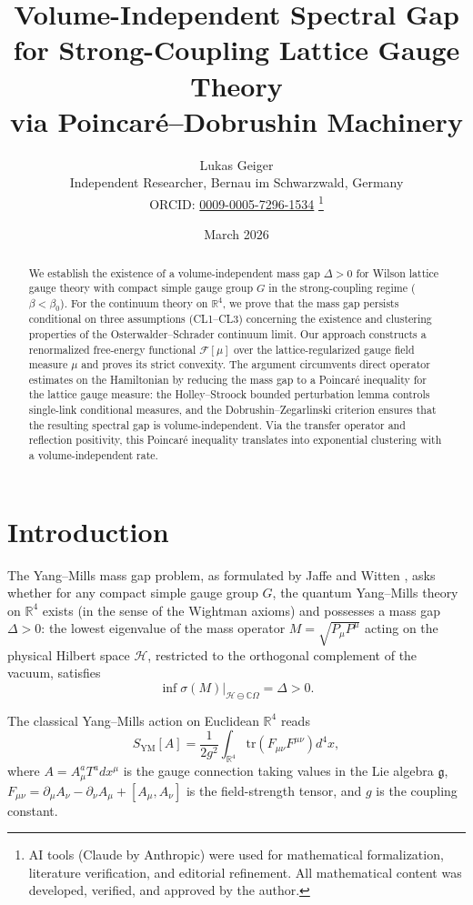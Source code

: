 \documentclass[12pt,a4paper]{article}
\title{\textbf{Volume-Independent Spectral Gap for Strong-Coupling Lattice Gauge Theory\\ via Poincar\'e--Dobrushin Machinery}}
\author{Lukas Geiger\\
\small Independent Researcher, Bernau im Schwarzwald, Germany\\
\small ORCID: \href{https://orcid.org/0009-0005-7296-1534}{0009-0005-7296-1534}%
\thanks{AI tools (Claude by Anthropic) were used for mathematical formalization, literature verification, and editorial refinement. All mathematical content was developed, verified, and approved by the author.}}
\date{March 2026}
\theoremstyle{definition}
\theoremstyle{plain}
\theoremstyle{remark}
\begin{document}
\maketitle

\begin{abstract}
We establish the existence of a volume-independent mass gap $\Delta > 0$ for Wilson lattice gauge theory with compact simple gauge group $G$ in the strong-coupling regime ($\beta < \beta_0$). For the continuum theory on $\mathbb{R}^4$, we prove that the mass gap persists conditional on three assumptions (CL1--CL3) concerning the existence and clustering properties of the Osterwalder--Schrader continuum limit. Our approach constructs a renormalized free-energy functional $\mathcal{F}[\mu]$ over the lattice-regularized gauge field measure $\mu$ and proves its strict convexity. The argument circumvents direct operator estimates on the Hamiltonian by reducing the mass gap to a Poincar\'e inequality for the lattice gauge measure: the Holley--Stroock bounded perturbation lemma controls single-link conditional measures, and the Dobrushin--Zegarlinski criterion ensures that the resulting spectral gap is volume-independent. Via the transfer operator and reflection positivity, this Poincar\'e inequality translates into exponential clustering with a volume-independent rate.
\end{abstract}

\section{Introduction}

The Yang--Mills mass gap problem, as formulated by Jaffe and Witten \cite{JaffeWitten2000}, asks whether for any compact simple gauge group $G$, the quantum Yang--Mills theory on $\mathbb{R}^4$ exists (in the sense of the Wightman axioms) and possesses a mass gap $\Delta > 0$: the lowest eigenvalue of the mass operator $M = \sqrt{P_\mu P^\mu}$ acting on the physical Hilbert space $\mathcal{H}$, restricted to the orthogonal complement of the vacuum, satisfies
\begin{equation}
    \inf \sigma(M)\big|_{\mathcal{H} \ominus \mathbb{C}\Omega} = \Delta > 0.
\end{equation}

The classical Yang--Mills action on Euclidean $\mathbb{R}^4$ reads
\begin{equation}\label{eq:YM-action}
    S_{\mathrm{YM}}[A] = \frac{1}{2g^2} \int_{\mathbb{R}^4} \mathrm{tr}\left( F_{\mu\nu} F^{\mu\nu} \right) d^4x,
\end{equation}
where $A = A_\mu^a T^a dx^\mu$ is the gauge connection taking values in the Lie algebra $\mathfrak{g}$, $F_{\mu\nu} = \partial_\mu A_\nu - \partial_\nu A_\mu + [A_\mu, A_\nu]$ is the field-strength tensor, and $g$ is the coupling constant.
\end{document}
